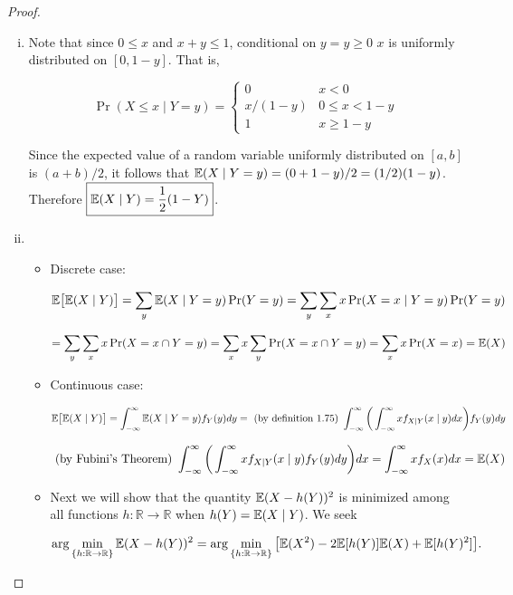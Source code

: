 \begin{proof}


\begin{enumerate}[(i)]

\item 


Note that since \(0 \leq x\) and \(x + y \leq 1\), conditional on \(y = y \geq 0\) \(x\) is uniformly distributed on \([0, 1-y]\). That is,

\[
\Pr(X \leq x \mid Y = y) = \begin{cases}
0 & x < 0 \\
x/(1-y) & 0 \leq x < 1 - y \\
1 & x \geq 1-y
\end{cases}
\]


Since the expected value of a random variable uniformly distributed on \([a,b]\) is \((a+b)/2\), it follows that \(\mathbb{E}(X \mid Y=y) = (0 + 1 -y)/2 = (1/2)(1-y)\). Therefore \(\boxed{\mathbb{E}(X \mid Y ) = \frac{1}{2}(1-Y)}\).


\item \begin{itemize}




\item Discrete case:

\[
\mathbb{E}\big[ \mathbb{E}(X \mid Y) \big] = \sum_{y} \mathbb{E}(X \mid Y = y) \Pr(Y=y) =  \sum_{y} \sum_{x} x \Pr(X=x \mid Y=y) \Pr(Y=y) 
\]

\[
=  \sum_{y} \sum_{x} x \Pr(X=x \cap Y=y) =  \sum_{x}x \sum_{y}  \Pr(X=x \cap Y=y) = \sum_x x \Pr(X=x) = \mathbb{E}(X)
\]

\item Continuous case:

\[
\mathbb{E}\big[ \mathbb{E}(X \mid Y) \big]  = \int_{-\infty}^\infty \mathbb{E}(X \mid Y = y) f_Y(y) dy = \text{ (by definition 1.75) }  \int_{-\infty}^\infty \bigg( \int_{-\infty}^\infty x f_{X\mid Y}(x \mid y) dx \bigg)  f_Y(y) dy
\]

\[
\text{ (by Fubini's Theorem) }  \int_{-\infty}^\infty \bigg( \int_{-\infty}^\infty x f_{X\mid Y}(x \mid y)  f_Y(y) dy \bigg)  dx = \int_{-\infty}^\infty x f_X(x) dx = \mathbb{E}(X)
\]

\item Next we will show that the quantity \(\mathbb{E}(X - h(Y))^2\) is minimized among all functions $h: \mathbb{R}\to\mathbb{R}$ when $h(Y)=\mathbb{E}(X \mid Y)$. We seek

\[
 \arg \min_{\{h: \mathbb{R}\to\mathbb{R} \}} \mathbb{E}(X - h(Y))^2 = \arg \min_{\{h: \mathbb{R}\to\mathbb{R}\}} \big[ \mathbb{E}(X^2) - 2 \mathbb{E}[h(Y)] \mathbb{E}(X) +  \mathbb{E}[h(Y)^2] \big].
  \]



\end{itemize}
\end{enumerate}
\end{proof}
